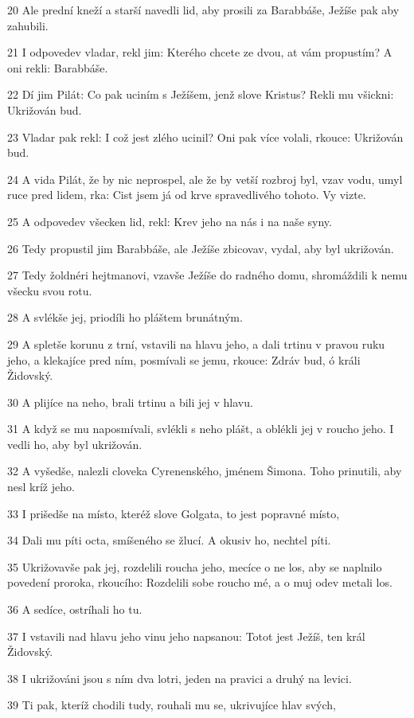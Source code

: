 \par 20 Ale prední kneží a starší navedli lid, aby prosili za Barabbáše, Ježíše pak aby zahubili.
\par 21 I odpovedev vladar, rekl jim: Kterého chcete ze dvou, at vám propustím? A oni rekli: Barabbáše.
\par 22 Dí jim Pilát: Co pak uciním s Ježíšem, jenž slove Kristus? Rekli mu všickni: Ukrižován bud.
\par 23 Vladar pak rekl: I což jest zlého ucinil? Oni pak více volali, rkouce: Ukrižován bud.
\par 24 A vida Pilát, že by nic neprospel, ale že by vetší rozbroj byl, vzav vodu, umyl ruce pred lidem, rka: Cist jsem já od krve spravedlivého tohoto. Vy vizte.
\par 25 A odpovedev všecken lid, rekl: Krev jeho na nás i na naše syny.
\par 26 Tedy propustil jim Barabbáše, ale Ježíše zbicovav, vydal, aby byl ukrižován.
\par 27 Tedy žoldnéri hejtmanovi, vzavše Ježíše do radného domu, shromáždili k nemu všecku svou rotu.
\par 28 A svlékše jej, priodíli ho pláštem brunátným.
\par 29 A spletše korunu z trní, vstavili na hlavu jeho, a dali trtinu v pravou ruku jeho, a klekajíce pred ním, posmívali se jemu, rkouce: Zdráv bud, ó králi Židovský.
\par 30 A plijíce na neho, brali trtinu a bili jej v hlavu.
\par 31 A když se mu naposmívali, svlékli s neho plášt, a oblékli jej v roucho jeho. I vedli ho, aby byl ukrižován.
\par 32 A vyšedše, nalezli cloveka Cyrenenského, jménem Šimona. Toho prinutili, aby nesl kríž jeho.
\par 33 I prišedše na místo, kteréž slove Golgata, to jest popravné místo,
\par 34 Dali mu píti octa, smíšeného se žlucí. A okusiv ho, nechtel píti.
\par 35 Ukrižovavše pak jej, rozdelili roucha jeho, mecíce o ne los, aby se naplnilo povedení proroka, rkoucího: Rozdelili sobe roucho mé, a o muj odev metali los.
\par 36 A sedíce, ostríhali ho tu.
\par 37 I vstavili nad hlavu jeho vinu jeho napsanou: Totot jest Ježíš, ten král Židovský.
\par 38 I ukrižováni jsou s ním dva lotri, jeden na pravici a druhý na levici.
\par 39 Ti pak, kteríž chodili tudy, rouhali mu se, ukrivujíce hlav svých,
